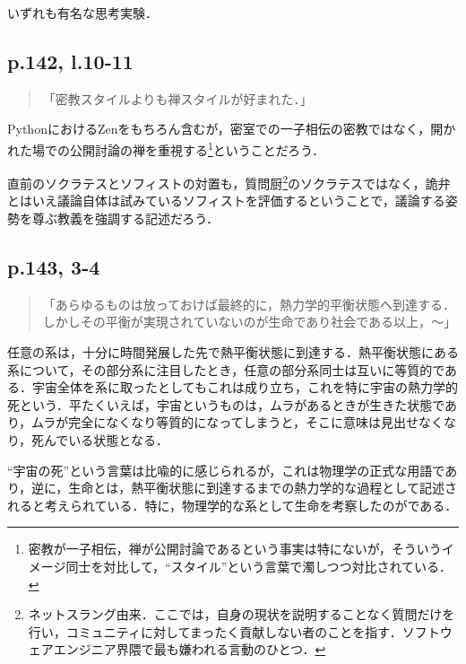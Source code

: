 \documentclass[10pt, a5paper, twoside]{jsarticle}
\theoremstyle{definition}
\begin{document}
			いずれも有名な思考実験．



		\subsection{p.142, l.10-11}

			\begin{quote}
				
				「密教スタイルよりも禅スタイルが好まれた．」

			\end{quote}

			PythonにおけるZenをもちろん含むが，密室での一子相伝の密教ではなく，開かれた場での公開討論の禅を重視する\footnote{密教が一子相伝，禅が公開討論であるという事実は特にないが，そういうイメージ同士を対比して，“スタイル”という言葉で濁しつつ対比されている．}ということだろう．

			直前のソクラテスとソフィストの対置も，質問厨\footnote{ネットスラング由来．ここでは，自身の現状を説明することなく質問だけを行い，コミュニティに対してまったく貢献しない者のことを指す．ソフトウェアエンジニア界隈で最も嫌われる言動のひとつ．}のソクラテスではなく，詭弁とはいえ議論自体は試みているソフィストを評価するということで，議論する姿勢を尊ぶ教義を強調する記述だろう．

		\subsection{p.143, 3-4}

			\begin{quote}
				
				「あらゆるものは放っておけば最終的に，熱力学的平衡状態へ到達する．しかしその平衡が実現されていないのが生命であり社会である以上，〜」

			\end{quote}

			任意の系は，十分に時間発展した先で熱平衡状態に到達する．熱平衡状態にある系について，その部分系に注目したとき，任意の部分系同士は互いに等質的である．宇宙全体を系に取ったとしてもこれは成り立ち，これを特に宇宙の熱力学的死という．平たくいえば，宇宙というものは，ムラがあるときが生きた状態であり，ムラが完全になくなり等質的になってしまうと，そこに意味は見出せなくなり，死んでいる状態となる．

			“宇宙の死”という言葉は比喩的に感じられるが，これは物理学の正式な用語であり，逆に，生命とは，熱平衡状態に到達するまでの熱力学的な過程として記述されると考えられている．特に，物理学的な系として生命を考察したのが\cite{shr}である．
\end{document}
